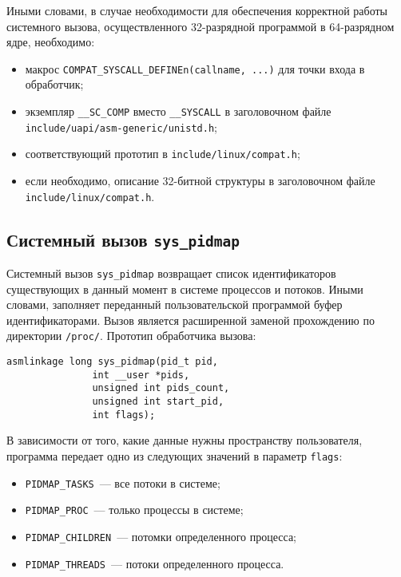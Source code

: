 Иными словами, в случае необходимости для обеспечения корректной работы
системного вызова, осуществленного 32-разрядной программой в 64-разрядном ядре,
необходимо:

\begin{itemize}
\item макрос \texttt{COMPAT\_SYSCALL\_DEFINEn(callname, ...)} для точки входа в
  обработчик;
\item экземпляр \texttt{\_\_SC\_COMP} вместо \texttt{\_\_SYSCALL} в заголовочном
  файле \texttt{include/uapi/asm-generic/unistd.h};
\item соответствующий прототип в \texttt{include/linux/compat.h};
\item если необходимо, описание 32-битной структуры в заголовочном файле
  \texttt{include/linux/compat.h}.
\end{itemize}

\subsection{Системный вызов \texttt{sys\_pidmap}}

Системный вызов \texttt{sys\_pidmap} возвращает список идентификаторов
существующих в данный момент в системе процессов и потоков. Иными словами,
заполняет переданный пользовательской программой буфер идентификаторами. Вызов
является расширенной заменой прохождению по директории \texttt{/proc/}. Прототип
обработчика вызова:

\medskip
\begin{lstlisting}[style=cstyle]
asmlinkage long sys_pidmap(pid_t pid,
			   int __user *pids,
			   unsigned int pids_count,
			   unsigned int start_pid,
			   int flags);
\end{lstlisting}
\medskip

В зависимости от того, какие данные нужны пространству пользователя, программа
передает одно из следующих значений в параметр \texttt{flags}:

\begin{itemize}
\item \texttt{PIDMAP\_TASKS}~--- все потоки в системе;
\item \texttt{PIDMAP\_PROC}~--- только процессы в системе;
\item \texttt{PIDMAP\_CHILDREN}~--- потомки определенного процесса;
\item \texttt{PIDMAP\_THREADS}~--- потоки определенного процесса.
\end{itemize}

